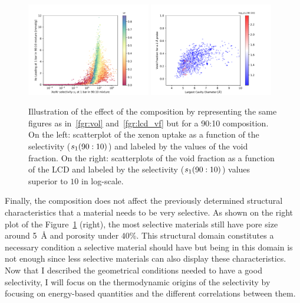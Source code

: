 \documentclass[main.tex]{subfiles}
\begin{document}
\begin{figure}[ht!]
  \centering
  \includegraphics[width=0.48\textwidth]{figures/2-thermo/Scatterplot_uptake_selectivity_vol_9010.pdf}  
  \includegraphics[width=0.48\textwidth]{figures/2-thermo/Scatterplot_vf_lcd_selectivity9010.pdf}
  \caption{Illustration of the effect of the composition by representing the same figures as in~\ref{fgr:vol} and~\ref{fgr:lcd_vf} but for a 90:10 composition. On the left: scatterplot of the xenon uptake as a function of the selectivity ($s_{\text{1}}(90:10)$) and labeled by the values of the void fraction. On the right: scatterplots of the void fraction as a function of the LCD and labeled by the selectivity ($s_{\text{1}}(90:10)$) values superior to $10$ in log-scale.}\label{fgr:compo}
\end{figure}

Finally, the composition does not affect the previously determined structural characteristics that a material needs to be very selective. As shown on the right plot of the Figure~\ref{fgr:compo} (right), the most selective materials still have pore size around \SI{5}{\angstrom} and porosity under {$40$\%}. This structural domain constitutes a necessary condition a selective material should have but being in this domain is not enough since less selective materials can also display these characteristics. Now that I described the geometrical conditions needed to have a good selectivity, I will focus on the thermodynamic origins of the selectivity by focusing on energy-based quantities and the different correlations between them.
\end{document}
